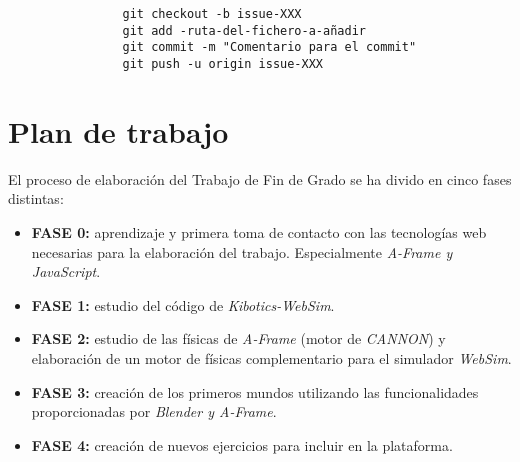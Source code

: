\begin{verbatim}
                git checkout -b issue-XXX
                git add -ruta-del-fichero-a-añadir
                git commit -m "Comentario para el commit"
                git push -u origin issue-XXX
\end{verbatim}

\section{Plan de trabajo}
El proceso de elaboración del Trabajo de Fin de Grado se ha divido en cinco fases distintas:
\begin{itemize}
    \item \textbf{FASE 0:} aprendizaje y primera toma de contacto con las tecnologías web necesarias para la elaboración del trabajo. Especialmente \textit{A-Frame y JavaScript}.
    \item \textbf{FASE 1:} estudio del código de \textit{Kibotics-WebSim}.
    \item \textbf{FASE 2:} estudio de las físicas de \textit{A-Frame} (motor de \textit{CANNON}) y elaboración de un motor de físicas complementario para el simulador \textit{WebSim}.
    \item \textbf{FASE 3:} creación de los primeros mundos utilizando las funcionalidades proporcionadas por \textit{Blender y A-Frame}.
    \item \textbf{FASE 4:} creación de nuevos ejercicios para incluir en la plataforma.
\end{itemize}